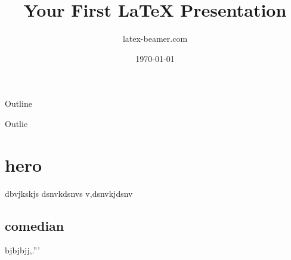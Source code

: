 \documentclass{beamer}
\title{Your First \LaTeX{} Presentation}
\author{latex-beamer.com}
\date{\today}
\begin{document}
\begin{frame}
    \titlepage
\end{frame}

 \begin{frame}{Outline}
     \tableofcontents
    
 \end{frame}
\begin{frame}{Outlie}
     
     \section{hero}
     dbvjkskjs dsnvkdsnvs v,dsnvkjdsnv \\
     \subsection{comedian}
     bjbjbjj,.'''
\end{frame}

%
\end{document}
